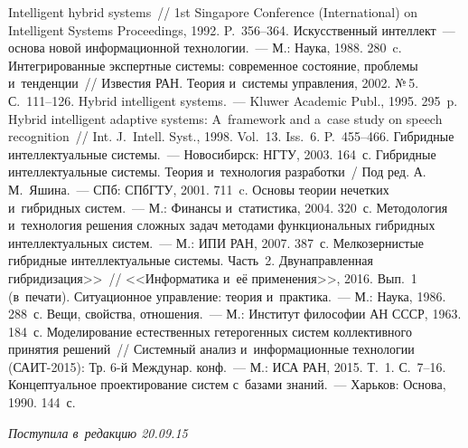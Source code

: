 \begin{multicols}{2}
{{\begin{thebibliography}{99}
 
 Intelligent hybrid systems~// 1st Singapore Conference 
(International) on Intelligent Systems Proceedings, 1992. P.~356--364.
 Искусственный интеллект~--- основа новой информационной 
технологии.~--- М.: Наука, 1988. 280~c.
 Интегрированные экспертные системы: современное состояние, 
проблемы и~тенденции~// Известия РАН. Теория и~системы управления, 2002. №\,5.  
С.~111--126.
 Hybrid intelligent systems.~--- Kluwer Academic Publ., 1995. 295~p.
 Hybrid intelligent adaptive systems: A~framework and a~case study 
on speech recognition~// Int. J.~Intell. Syst., 1998. Vol.~13. Iss.~6. P.~455--466.
 Гибридные интеллектуальные сис\-те\-мы.~--- Новосибирск: НГТУ, 2003. 
164~с.
 Гибридные интеллектуальные сис\-те\-мы. Теория и~технология 
разработки~/ Под ред. А.\,М.~Яшина.~--- СПб: СПбГТУ, 2001. 711~c.
 Основы теории нечетких и~гибридных сис\-тем.~--- М.: Финансы 
и~статистика, 2004. 320~с.
 Методология и~технология решения сложных задач 
методами функциональных гибридных интеллектуальных систем.~--- М.: ИПИ РАН, 2007. 
387~с.
 Мелкозернистые гибридные интеллектуальные системы. Часть~2. 
Двунаправленная 
гибридизация>>~// <<Информатика и~её применения>>, 2016. Вып.~1  (в~печати).
 Ситуационное управление: теория и~практика.~--- М.: Наука, 
1986. 288~с.
 Вещи, свойства, отношения.~--- М.: Институт философии АН СССР, 1963. 
184~с.
 Моделирование естественных гетерогенных систем 
коллективного принятия решений~// Системный анализ и~информационные 
технологии (САИТ-2015): Тр. 6-й Междунар. конф.~--- М.: ИСА РАН, 2015. Т.~1.  
С.~7--16.
 Концептуальное проектирование систем с~базами знаний.~--- Харьков: 
Основа, 1990. 144~с.
 \end{thebibliography}

 }
 }

\end{multicols}

\vspace*{-3pt}

\hfill{\small\textit{Поступила в~редакцию 20.09.15}}

